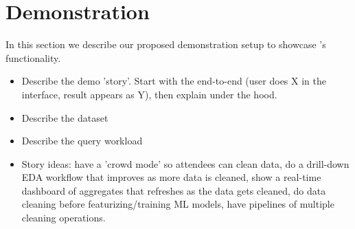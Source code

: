 \section{Demonstration}
In this section we describe our proposed demonstration setup to showcase \system's functionality.
\begin{itemize}
\item Describe the demo 'story'. Start with the end-to-end (user does X in the interface, result appears as Y), then explain under the hood.
\item Describe the dataset
\item Describe the query workload
\item Story ideas: have a 'crowd mode' so attendees can clean data, do a drill-down EDA workflow that improves as more data is cleaned, show a real-time dashboard of aggregates that refreshes as the data gets cleaned, do data cleaning before featurizing/training ML models, have pipelines of multiple cleaning operations.
\end{itemize}